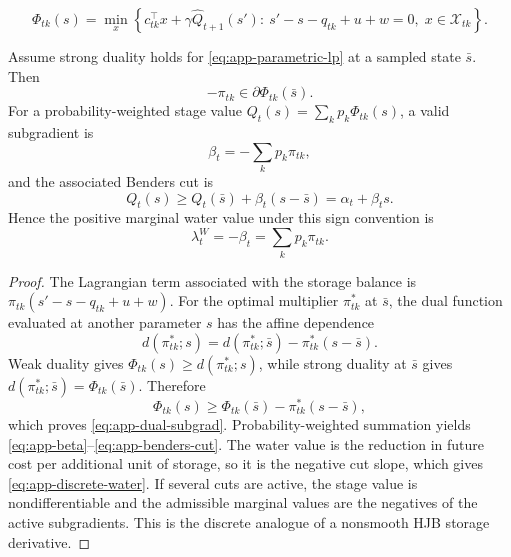 \documentclass[10pt,a4paper]{amsart}
\begin{document}
\begin{equation}
 \Phi_{tk}(s)=\min_{x}\left\{c_{tk}^{\top}x
 +\gamma\widehat Q_{t+1}(s'):\
 s'-s-q_{tk}+u+w=0,\;x\in\mathcal X_{tk}\right\}.
 \label{eq:app-parametric-lp}
\end{equation}

\begin{proposition}\label{prop:app-dual}
Assume strong duality holds for \eqref{eq:app-parametric-lp} at a sampled state
$\bar s$. Then
\begin{equation}
 -\pi_{tk}\in\partial\Phi_{tk}(\bar s).
 \label{eq:app-dual-subgrad}
\end{equation}
For a probability-weighted stage value
$Q_t(s)=\sum_kp_k\Phi_{tk}(s)$, a valid subgradient is
\begin{equation}
 \beta_t=-\sum_kp_k\pi_{tk},
 \label{eq:app-beta}
\end{equation}
and the associated Benders cut is
\begin{equation}
 Q_t(s)\ge Q_t(\bar s)+\beta_t(s-\bar s)
 =\alpha_t+\beta_t s.
 \label{eq:app-benders-cut}
\end{equation}
Hence the positive marginal water value under this sign convention is
\begin{equation}
 \lambda_t^W=-\beta_t=\sum_kp_k\pi_{tk}.
 \label{eq:app-discrete-water}
\end{equation}
\end{proposition}

\begin{proof}
The Lagrangian term associated with the storage balance is
$\pi_{tk}(s'-s-q_{tk}+u+w)$. For the optimal multiplier
$\pi_{tk}^*$ at $\bar s$, the dual function evaluated at another parameter $s$
has the affine dependence
\begin{equation}
 d(\pi_{tk}^*;s)=d(\pi_{tk}^*;\bar s)
 -\pi_{tk}^*(s-\bar s).
 \end{equation}
Weak duality gives $\Phi_{tk}(s)\ge d(\pi_{tk}^*;s)$, while strong duality at
$\bar s$ gives $d(\pi_{tk}^*;\bar s)=\Phi_{tk}(\bar s)$. Therefore
\begin{equation}
 \Phi_{tk}(s)\ge\Phi_{tk}(\bar s)
 -\pi_{tk}^*(s-\bar s),
\end{equation}
which proves \eqref{eq:app-dual-subgrad}. Probability-weighted summation yields
\eqref{eq:app-beta}--\eqref{eq:app-benders-cut}. The water value is the reduction
in future cost per additional unit of storage, so it is the negative cut slope,
which gives \eqref{eq:app-discrete-water}. If several cuts are active, the stage
value is nondifferentiable and the admissible marginal values are the negatives of
the active subgradients. This is the discrete analogue of a nonsmooth HJB storage
derivative.
\end{proof}
\end{document}
